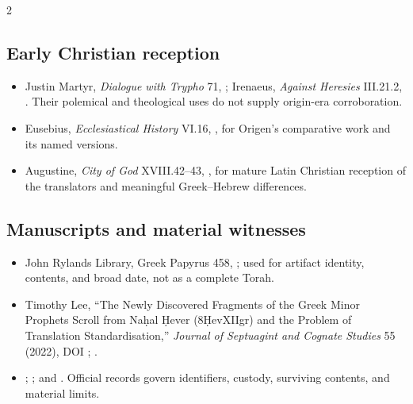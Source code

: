 \begin{multicols}{2}
\subsection*{Early Christian reception}

{\footnotesize
\begin{itemize}[itemsep=0.1em,topsep=0.15em]
\item Justin Martyr, \emph{Dialogue with Trypho} 71, ; Irenaeus, \emph{Against Heresies} III.21.2, . Their polemical and theological uses do not supply origin-era corroboration.
\item Eusebius, \emph{Ecclesiastical History} VI.16, , for Origen's comparative work and its named versions.
\item Augustine, \emph{City of God} XVIII.42--43, , for mature Latin Christian reception of the translators and meaningful Greek--Hebrew differences.
\end{itemize}}

\subsection*{Manuscripts and material witnesses}

{\footnotesize
\begin{itemize}[itemsep=0.1em,topsep=0.15em]
\item John Rylands Library, Greek Papyrus 458, ; used for artifact identity, contents, and broad date, not as a complete Torah.
\item Timothy Lee, “The Newly Discovered Fragments of the Greek Minor Prophets Scroll from Na\d{h}al \d{H}ever (8\d{H}evXIIgr) and the Problem of Translation Standardisation,” \emph{Journal of Septuagint and Cognate Studies} 55 (2022), DOI ; .
\item {}; ; and . Official records govern identifiers, custody, surviving contents, and material limits.
\end{itemize}}


\end{multicols}
